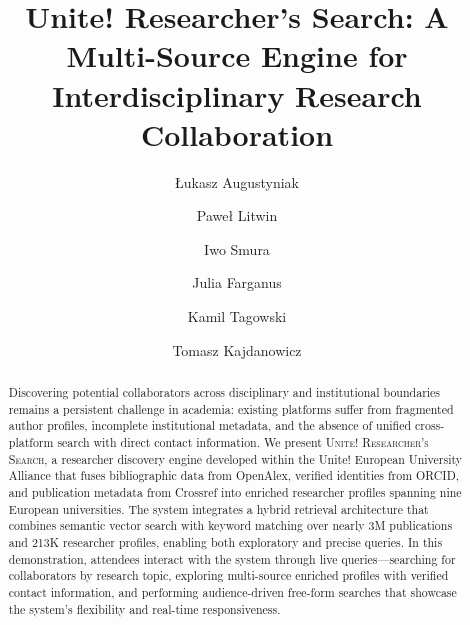 \documentclass[sigconf, nonacm]{acmart}
\begin{document}
\title{Unite! Researcher's Search: A Multi-Source Engine for Interdisciplinary Research Collaboration}

\author{Łukasz Augustyniak}

\author{Paweł Litwin}

\author{Iwo Smura}

\author{Julia Farganus}

\author{Kamil Tagowski}

\author{Tomasz Kajdanowicz}

\begin{abstract}
Discovering potential collaborators across disciplinary and institutional boundaries remains a persistent challenge in academia: existing platforms suffer from fragmented author profiles, incomplete institutional metadata, and the absence of unified cross-platform search with direct contact information.
We present \textsc{Unite! Researcher's Search}, a researcher discovery engine developed within the Unite! European University Alliance that fuses bibliographic data from OpenAlex, verified identities from ORCID, and publication metadata from Crossref into enriched researcher profiles spanning nine European universities.
The system integrates a hybrid retrieval architecture that combines semantic vector search with keyword matching over nearly 3M publications and 213K researcher profiles, enabling both exploratory and precise queries.
In this demonstration, attendees interact with the system through live queries---searching for collaborators by research topic, exploring multi-source enriched profiles with verified contact information, and performing audience-driven free-form searches that showcase the system's flexibility and real-time responsiveness.
\end{abstract}

\maketitle
\end{document}

